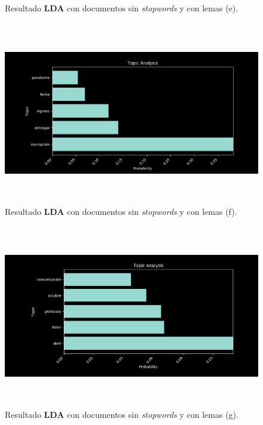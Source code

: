 \begin{itemize}
\begin{figure}[H]
            \caption{Resultado \textbf{LDA} con documentos sin \textit{stopwords} y con lemas (e).}
            \label{fig:ns_wl-5}
        \end{figure}
        \begin{figure}[H]
            \centering
            \includegraphics[height=8cm, width=16.5cm]{Latex/Classes/Imagenes/ns_wl-6.png}
            \caption{Resultado \textbf{LDA} con documentos sin \textit{stopwords} y con lemas (f).}
            \label{fig:ns_wl-6}
        \end{figure}
        \begin{figure}[H]
            \centering
            \includegraphics[height=8cm, width=16.5cm]{Latex/Classes/Imagenes/ns_wl-7.png}
            \caption{Resultado \textbf{LDA} con documentos sin \textit{stopwords} y con lemas (g).}
            \label{fig:ns_wl-7}
        \end{figure}
        \begin{figure}[H]
            \centering

\end{figure}
\end{itemize}
